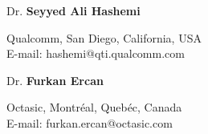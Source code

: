 \documentclass[10pt]{article}
\newenvironment{innerlist}[1][\enskip$\circ$]%
{\begin{compactitem}[#1]}{\end{compactitem}}
\begin{document}
	\halfblankline
	Dr. \textbf{Seyyed Ali Hashemi}
	\begin{innerlist}
		\item[] 
		Qualcomm, San Diego, California, USA\\
		{E-mail: hashemi@qti.qualcomm.com}
	\end{innerlist}	

	\halfblankline
	Dr. \textbf{Furkan Ercan}
	\begin{innerlist}
		\item[] 
		Octasic, Montr\'eal, Queb\'ec, Canada\\
		{E-mail: furkan.ercan@octasic.com}
	\end{innerlist}	
\end{document}

